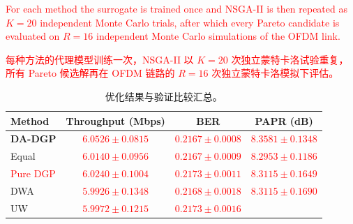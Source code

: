 \documentclass[11pt]{article}
\begin{document}
\textcolor{red}{For each method the surrogate is trained once and NSGA-II is then repeated as $K=20$ independent Monte Carlo trials, after which every Pareto candidate is evaluated on $R=16$ independent Monte Carlo simulations of the OFDM link.}%

\textcolor{red}{每种方法的代理模型训练一次，NSGA-II 以 $K=20$ 次独立蒙特卡洛试验重复，所有 Pareto 候选解再在 OFDM 链路的 $R=16$ 次独立蒙特卡洛模拟下评估。}%

\begin{table}[!htbp]
	\centering
	\caption{Summary of optimization results and validation comparisons.}
	\caption*{优化结果与验证比较汇总。}
	\label{tab:sim_results}
	\begin{tabular*}{\textwidth}{@{\extracolsep{\fill}}lccc}
		\toprule
		\textbf{Method} & \textbf{Throughput (Mbps)} & \textbf{BER} & \textbf{PAPR (dB)} \\
		\midrule
		\textbf{DA-DGP}                                          & \textcolor{red}{$\mathbf{6.0526 \pm 0.0815}$}%
		                                                        & \textcolor{red}{$0.2167 \pm 0.0008$}%
		                                                        & \textcolor{red}{$8.3581 \pm 0.1348$}\\%
		Equal                                                   & \textcolor{red}{$6.0140 \pm 0.0956$}%
		                                                        & \textcolor{red}{$0.2167 \pm 0.0009$}%
		                                                        & \textcolor{red}{$8.2953 \pm 0.1186$}\\%
		\textcolor{red}{Pure DGP}%
		                                                        & \textcolor{red}{$6.0240 \pm 0.1004$}%
		                                                        & \textcolor{red}{$0.2173 \pm 0.0011$}%
		                                                        & \textcolor{red}{$8.3115 \pm 0.1649$}\\%
		DWA                                                     & \textcolor{red}{$5.9926 \pm 0.1348$}%
		                                                        & \textcolor{red}{$0.2168 \pm 0.0018$}%
		                                                        & \textcolor{red}{$8.3115 \pm 0.1690$}\\%
		UW                                                      & \textcolor{red}{$5.9972 \pm 0.1215$}%
		                                                        & \textcolor{red}{$0.2173 \pm 0.0016$}%

\end{tabular*}
\end{table}
\end{document}
